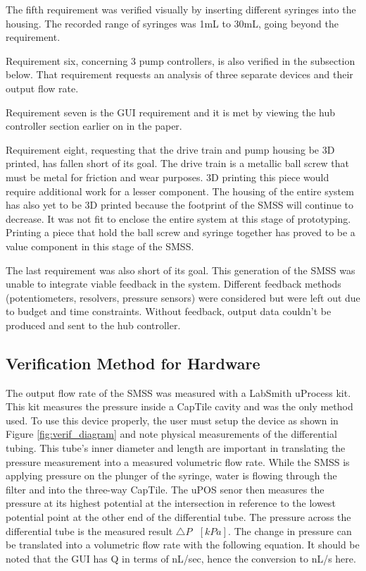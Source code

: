 \documentclass[journal]{IEEEtran}
\begin{document}
        The fifth requirement was verified visually by inserting different syringes into the housing. The recorded range of syringes was 1mL to 30mL, going beyond the requirement. 
        
        Requirement six, concerning 3 pump controllers, is also verified in the subsection below. That requirement requests an analysis of three separate devices and their output flow rate. 
        
        Requirement seven is the GUI requirement and it is met by viewing the hub controller section earlier on in the paper. 
        
        Requirement eight, requesting that the drive train and pump housing be 3D printed, has fallen short of its goal. The drive train is a metallic ball screw that must be metal for friction and wear purposes. 3D printing this piece would require additional work for a lesser component. The housing of the entire system has also yet to be 3D printed because the footprint of the SMSS will continue to decrease. It was not fit to enclose the entire system at this stage of prototyping. Printing a piece that hold the ball screw and syringe together has proved to be a value component in this stage of the SMSS. 
        
        The last requirement was also short of its goal. This generation of the SMSS was unable to integrate viable feedback in the system. Different feedback methods (potentiometers, resolvers, pressure sensors) were considered but were left out due to budget and time constraints. Without feedback, output data couldn't be produced and sent to the hub controller. 
        
    \subsection{Verification Method for Hardware}
        The output flow rate of the SMSS was measured with a LabSmith uProcess kit. This kit measures the pressure inside a CapTile cavity and was the only method used. To use this device properly, the user must setup the device as shown in Figure \ref{fig:verif_diagram} and note physical measurements of the differential tubing. This tube's inner diameter and length are important in translating the pressure measurement into a measured volumetric flow rate. While the SMSS is applying pressure on the plunger of the syringe, water is flowing through the filter and into the three-way CapTile. The uPOS senor then measures the pressure at its highest potential at the intersection in reference to the lowest potential point at the other end of the differential tube. The pressure across the differential tube is the measured result \( \triangle P   \,\,\,\, [kPa]  \). The change in pressure can be translated into a volumetric flow rate with the following equation. It should be noted that the GUI has Q in terms of nL/sec, hence the conversion to nL/s here.
        
\end{document}
